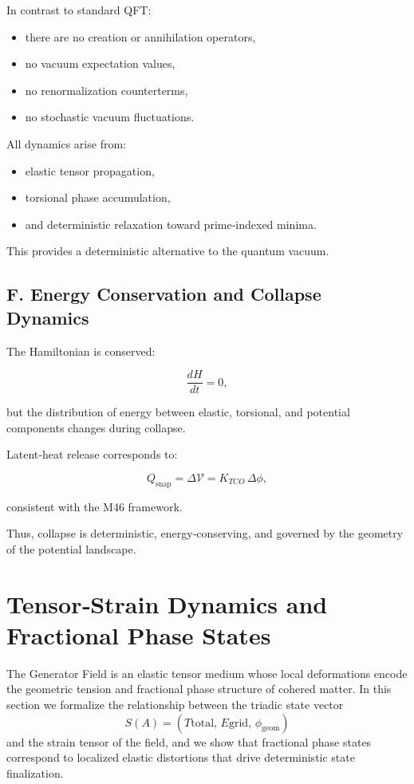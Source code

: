 \documentclass[reprint,amsmath,amssymb,aps,prl,floatfix]{revtex4-2}
\begin{document}
In contrast to standard QFT:
\begin{itemize}
\item there are no creation or annihilation operators,  
\item no vacuum expectation values,  
\item no renormalization counterterms,  
\item no stochastic vacuum fluctuations.
\end{itemize}

All dynamics arise from:
\begin{itemize}
\item elastic tensor propagation,  
\item torsional phase accumulation,  
\item and deterministic relaxation toward prime‑indexed minima.
\end{itemize}

This provides a deterministic alternative to the quantum vacuum.

\subsection{F. Energy Conservation and Collapse Dynamics}

The Hamiltonian is conserved:

\[
\frac{dH}{dt} = 0,
\]

but the distribution of energy between elastic, torsional, and potential components changes during collapse.
\medskip

Latent‑heat release corresponds to:

\[
Q_{\mathrm{snap}}
=
\Delta \mathcal{V}
=
K_{TCO}\,\Delta\phi,
\]

consistent with the M46 framework.

Thus, collapse is deterministic, energy‑conserving, and governed by the geometry of the potential landscape.

\section{Tensor‑Strain Dynamics and Fractional Phase States}

The Generator Field is an elastic tensor medium whose local deformations encode the geometric tension and fractional phase structure of cohered matter. In this section we formalize the relationship between the triadic state vector  
\[
S(A) = (T{\mathrm{total}},\,E{\mathrm{grid}},\,\phi_{\mathrm{geom}})
\]  
and the strain tensor of the field, and we show that fractional phase states correspond to localized elastic distortions that drive deterministic state finalization.
\end{document}
